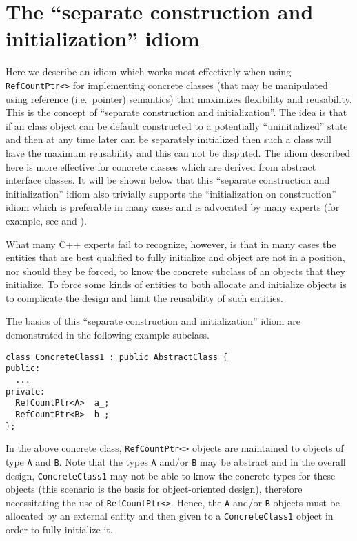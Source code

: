 %
\section{The ``separate construction and initialization'' idiom}
\label{rcp:apdx:sep-construct-init}
%

Here we describe an idiom which works most effectively when using
{}\texttt{RefCountPtr<>} for implementing concrete classes (that may
be manipulated using reference (i.e.~pointer) semantics) that
maximizes flexibility and reusability.  This is the concept of
``separate construction and initialization''.  The idea is that if an
class object can be default constructed to a potentially
``uninitialized'' state and then at any time later can be separately
initialized then such a class will have the maximum reusability and
this can not be disputed.  The idiom described here is more effective
for concrete classes which are derived from abstract interface
classes.  It will be shown below that this ``separate construction and
initialization'' idiom also trivially supports the ``initialization
on construction'' idiom which is preferable in many cases and is
advocated by many experts (for example, see {}\cite[Section
10.2.3]{ref:stroustrup_2000} and {}\cite[Item 4]{ref:meyers_1996}).

What many C++ experts fail to recognize, however, is that in many
cases the entities that are best qualified to fully initialize and
object are not in a position, nor should they be forced, to know the
concrete subclass of an objects that they initialize.  To force some
kinds of entities to both allocate and initialize objects is to
complicate the design and limit the reusability of such entities.

The basics of this ``separate construction and initialization'' idiom
are demonstrated in the following example subclass.

{\scriptsize\begin{verbatim}
class ConcreteClass1 : public AbstractClass {
public:
  ...
private:
  RefCountPtr<A>  a_;
  RefCountPtr<B>  b_;
};
\end{verbatim}}

{}\noindent{}In the above concrete class, {}\texttt{RefCountPtr<>}
objects are maintained to objects of type {}\texttt{A} and
{}\texttt{B}.  Note that the types {}\texttt{A} and/or {}\texttt{B}
may be abstract and in the overall design, {}\texttt{ConcreteClass1}
may not be able to know the concrete types for these objects (this
scenario is the basis for object-oriented design), therefore
necessitating the use of {}\texttt{RefCountPtr<>}.  Hence, the
{}\texttt{A} and/or {}\texttt{B} objects must be allocated by an
external entity and then given to a {}\texttt{ConcreteClass1} object
in order to fully initialize it.

